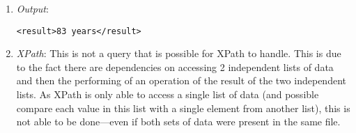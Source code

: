 \documentclass[11pt]{article}
\begin{document}
\begin{enumerate}
\item \textit{Output}:
\begin{verbatim}
<result>83 years</result>
\end{verbatim} 
\item \textit{XPath}: This is not a query that is possible for XPath to handle. This is due to the fact there are dependencies on accessing 2 independent lists of data and then the performing of an operation of the result of the two independent lists. As XPath is only able to access a single list of data (and possible compare each value in this list with a single element from another list), this is not able to be done---even if both sets of data were present in the same file.
\end{enumerate}



\end{document}
